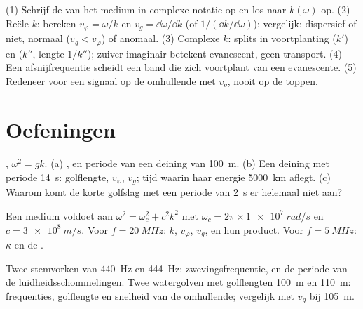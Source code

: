 \begin{method}\label{met:b2:dispersion-wave-packets:method}
(1) Schrijf de  van het medium in complexe notatie op en los
naar $\underline k(\omega)$ op. (2) Reële $k$: bereken
$v_\varphi = \omega/k$ en $v_g = \dd\omega/\dd k$ (of
$1/(\dd k/\dd\omega)$); vergelijk: dispersief of niet, normaal
($v_g < v_\varphi$) of anomaal. (3) Complexe $k$: splits in voortplanting
($k'$) en  ($k''$, lengte $1/k''$); zuiver imaginair betekent
evanescent, geen transport. (4) Een afsnijfrequentie scheidt een band die
zich voortplant van een evanescente. (5) Redeneer voor een signaal op de
omhullende met $v_g$, nooit op de toppen.
\end{method}

\section{Oefeningen}

\begin{exercise}[$\star$]\label{exo:b2:dispersion-wave-packets:1}
, $\omega^2 = gk$. (a) ,  en
periode van een deining van \qty{100}{m}. (b) Een deining met periode
\qty{14}{s}: golflengte, $v_\varphi$, $v_g$; tijd waarin haar energie
\qty{5000}{km} aflegt. (c) Waarom komt de korte golfslag met een periode van
\qty{2}{s} er helemaal niet aan?
\end{exercise}

\begin{exercise}[$\star$]\label{exo:b2:dispersion-wave-packets:2}
Een medium voldoet aan $\omega^2 = \omega_c^2 + c^2k^2$ met
$\omega_c = 2\pi \times \qty{1e7}{rad/s}$ en $c = \qty{3e8}{m/s}$. Voor
$f = \qty{20}{MHz}$: $k$, $v_\varphi$, $v_g$, en hun product. Voor
$f = \qty{5}{MHz}$: $\kappa$ en de .
\end{exercise}

\begin{exercise}[$\star$]\label{exo:b2:dispersion-wave-packets:3}
Twee stemvorken van \qty{440}{Hz} en \qty{444}{Hz}: zwevingsfrequentie, en
de periode van de luidheidsschommelingen. Twee watergolven met golflengten
\qty{100}{m} en \qty{110}{m}: frequenties, golflengte en snelheid van de
omhullende; vergelijk met $v_g$ bij \qty{105}{m}.
\end{exercise}

